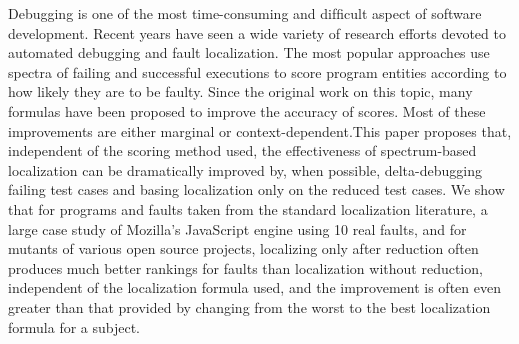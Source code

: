 Debugging is one of the most time-consuming and difﬁcult aspect of software development. Recent years have seen a wide variety of research efforts devoted to automated debugging and fault localization. The most popular approaches use spectra of failing and successful executions to score program entities according to how likely they are to be faulty. Since the original work on this topic, many formulas have been proposed to improve the accuracy of scores. Most of these improvements are either marginal or context-dependent.This paper proposes that, independent of the scoring method used, the effectiveness of spectrum-based localization can be dramatically improved by, when possible, delta-debugging failing test cases and basing localization only on the reduced test cases. We show that for programs and faults taken from the standard localization literature, a large case study of Mozilla’s JavaScript engine using 10 real faults, and for mutants of various open source projects, localizing only after reduction often produces much better rankings for faults than localization without reduction, independent of the localization formula used, and the improvement is often even greater than that provided by changing from the worst to the best localization formula for a subject.